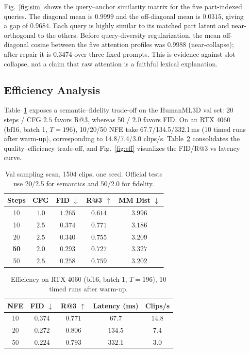 \documentclass[journal]{IEEEtran}
\begin{document}
Fig.~\ref{fig:sim} shows the query--anchor similarity matrix for the five part-indexed queries. The diagonal mean is $0.9999$ and the off-diagonal mean is $0.0315$, giving a gap of $0.9684$. Each query is highly similar to its matched part latent and near-orthogonal to the others. Before query-diversity regularization, the mean off-diagonal cosine between the five attention profiles was $0.9988$ (near-collapse); after repair it is $0.3474$ over three fixed prompts. This is evidence against slot collapse, not a claim that raw attention is a faithful lexical explanation.

\subsection{Efficiency Analysis}
\label{sec:eff}

Table~\ref{tab:sweep} exposes a semantic--fidelity trade-off on the HumanML3D val set: 20 steps / CFG $2.5$ favors R@3, whereas 50 / $2.0$ favors FID. On an RTX 4060 (bf16, batch 1, $T{=}196$), 10/20/50 NFE take 67.7/134.5/332.1\,ms (10 timed runs after warm-up), corresponding to 14.8/7.4/3.0 clips/s. Table~\ref{tab:eff} consolidates the quality--efficiency trade-off, and Fig.~\ref{fig:eff} visualizes the FID/R@3 vs latency curve.

\begin{table}[t]
\centering
\caption{Val sampling scan, 1504 clips, one seed. Official tests use 20/2.5 for semantics and 50/2.0 for fidelity.}
\label{tab:sweep}
\small
\setlength{\tabcolsep}{3.4pt}
\begin{tabular}{@{}ccccc@{}}
\toprule
Steps & CFG & FID $\downarrow$ & R@3 $\uparrow$ & MM Dist $\downarrow$ \\
\midrule
10 & $1.0$ & $1.265$ & $0.614$ & $3.996$ \\
10 & $2.5$ & $0.374$ & $0.771$ & $3.186$ \\
20 & $2.5$ & $0.340$ & $0.755$ & $3.209$ \\
\textbf{50} & $\mathbf{2.0}$ & $\mathbf{0.293}$ & $0.727$ & $3.327$ \\
50 & $2.5$ & $0.258$ & $0.759$ & $3.202$ \\
\bottomrule
\end{tabular}
\end{table}

\begin{table}[t]
\centering
\caption{Efficiency on RTX 4060 (bf16, batch 1, $T{=}196$), 10 timed runs after warm-up.}
\label{tab:eff}
\small
\setlength{\tabcolsep}{3.2pt}
\begin{tabular}{@{}ccccc@{}}
\toprule
NFE & FID $\downarrow$ & R@3 $\uparrow$ & Latency (ms) & Clips/s \\
\midrule
10 & $0.374$ & $0.771$ & $67.7$ & $14.8$ \\
20 & $0.272$ & $0.806$ & $134.5$ & $7.4$ \\
50 & $0.224$ & $0.793$ & $332.1$ & $3.0$ \\
\bottomrule
\end{tabular}
\end{table}
\end{document}
